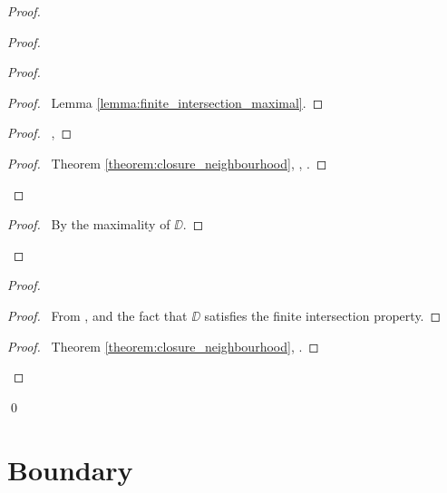 \begin{proof}
    \pf
    \begin{proof}
        \begin{proof}
            \begin{proof}
                \pf\ Lemma \ref{lemma:finite_intersection_maximal}.
            \end{proof}
            \begin{proof}
                \pf\ , 
            \end{proof}
            \begin{proof}
                \pf\ Theorem \ref{theorem:closure_neighbourhood}, , .
            \end{proof}
        \end{proof}
        \begin{proof}
            \pf\ By the maximality of $\DD$.
        \end{proof}
    \end{proof}
    \begin{proof}
        \begin{proof}
            \pf\ From ,  and the fact that $\DD$ satisfies the finite intersection property.
        \end{proof}
        \begin{proof}
            \pf\ Theorem \ref{theorem:closure_neighbourhood}, .
        \end{proof}
    \end{proof}
    \qed
\end{proof}

\section{Boundary}

